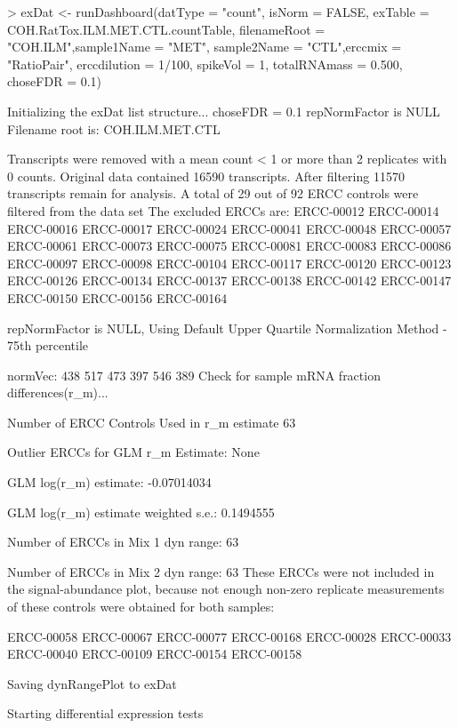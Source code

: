 \documentclass{article}
\begin{document}
\begin{Schunk}
\begin{Sinput}
> exDat <- runDashboard(datType = "count", isNorm = FALSE,
                         exTable = COH.RatTox.ILM.MET.CTL.countTable,
                         filenameRoot = "COH.ILM",sample1Name = "MET",
                         sample2Name = "CTL",erccmix = "RatioPair",
                         erccdilution = 1/100, spikeVol = 1,
                         totalRNAmass = 0.500, choseFDR = 0.1)
\end{Sinput}
\begin{Soutput}
Initializing the exDat list structure...
choseFDR = 0.1 
repNormFactor is NULL 
Filename root is: COH.ILM.MET.CTL 

Transcripts were removed with a mean count < 1 or more than 2 
replicates with 0 counts.
Original data contained  16590 transcripts. 
After filtering  11570 transcripts remain for  analysis.
A total of 29 out of 92 
ERCC controls were filtered from the data set
The excluded ERCCs are:
ERCC-00012 ERCC-00014 ERCC-00016 ERCC-00017 ERCC-00024
ERCC-00041 ERCC-00048 ERCC-00057 ERCC-00061 ERCC-00073
ERCC-00075 ERCC-00081 ERCC-00083 ERCC-00086 ERCC-00097
ERCC-00098 ERCC-00104 ERCC-00117 ERCC-00120 ERCC-00123
ERCC-00126 ERCC-00134 ERCC-00137 ERCC-00138 ERCC-00142
ERCC-00147 ERCC-00150 ERCC-00156 ERCC-00164

repNormFactor is NULL,
 Using Default Upper Quartile Normalization Method  - 75th percentile

normVec:
438 517 473 397 546 389
Check for sample mRNA fraction differences(r_m)...

Number of ERCC Controls Used in r_m estimate
63 

Outlier ERCCs for GLM r_m Estimate:
None 

GLM log(r_m) estimate:
-0.07014034 

GLM log(r_m) estimate weighted s.e.:
0.1494555 

Number of ERCCs in Mix 1 dyn range:  63 

Number of ERCCs in Mix 2 dyn range:  63 
These ERCCs were not included in the signal-abundance plot,
because not enough non-zero replicate measurements of these 
controls were obtained for both samples:

ERCC-00058 ERCC-00067 ERCC-00077 ERCC-00168 ERCC-00028
ERCC-00033 ERCC-00040 ERCC-00109 ERCC-00154 ERCC-00158


Saving dynRangePlot to exDat

Starting differential expression tests


\end{Soutput}
\end{Schunk}
\end{document}
